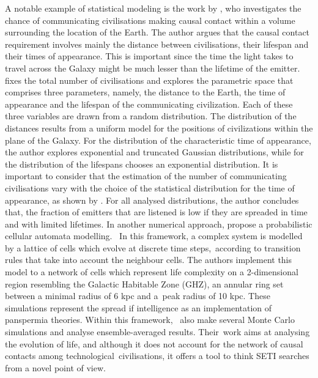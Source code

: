 \documentclass[crop]{CSLB}
\begin{document}
A notable example of statistical modeling is the work by
\citet{balbi_impact_2018}, who investigates the chance of
communicating civilisations making causal contact within a volume
surrounding the location of the Earth.
%
The author argues that the causal contact requirement involves mainly
the distance between civilisations, their lifespan and their times of
appearance.
%
This is important since the time the light takes to travel across the
Galaxy might be much lesser than the lifetime of the emitter.
%
\citet{balbi_impact_2018} fixes the total number of civilisations and
explores the parametric space that comprises three parameters, namely,
the distance to the Earth, the time of appearance and the lifespan of
the communicating civilization.
%
Each of these three variables are drawn from a random distribution.
%
The distribution of the distances results from a uniform model for the
positions of civilizations within the plane of the Galaxy.
%
For the distribution of the characteristic time of appearance, the
author explores exponential and truncated Gaussian distributions,
while for the distribution of the lifespans chooses an exponential
distribution.
%
It is important to consider that the estimation of the number of
communicating civilisations vary with the choice of the statistical
distribution for the time of appearance, as shown by
\citet{balbi_impact_2018}.
%
For all analysed distributions, the author concludes that, the
fraction of emitters that are listened is low if they are spreaded in
time and with limited lifetimes.
%
In another numerical approach, \citet{vukotic_astrobiological_2012}
propose a probabilistic cellular automata modelling. 
%
In this framework, a complex system is modelled by a lattice of cells
which evolve at discrete time steps, according to transition rules
that take into account the neighbour cells.
%
The authors implement this model to a network of cells which represent
life complexity on a 2-dimensional region resembling the Galactic
Habitable Zone (GHZ), an annular ring set between a minimal radius of
6 kpc and a peak radius of 10 kpc.
%
These simulations represent the spread if intelligence as an
implementation of panspermia theories.
%
Within this framework, \citet{vukotic_astrobiological_2012} also make
several Monte Carlo simulations and analyse ensemble-averaged results.
%
Their work aims at analysing the evolution of life, and although it
does not account for the network of causal contacts among
technological civilisations, it offers a tool to think SETI searches
from a novel point of view.
\end{document}
